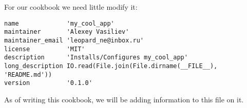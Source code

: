 For our cookbook we need little modify it:

\begin{lstlisting}[label=lst:cookbook-metadata2,title=my-server-cloud/site-cookbooks/my\_cool\_app/metadata.rb]
name             'my_cool_app'
maintainer       'Alexey Vasiliev'
maintainer_email 'leopard_ne@inbox.ru'
license          'MIT'
description      'Installs/Configures my_cool_app'
long_description IO.read(File.join(File.dirname(__FILE__), 'README.md'))
version          '0.1.0'
\end{lstlisting}

As of writing this cookbook, we will be adding information to this file on it.
